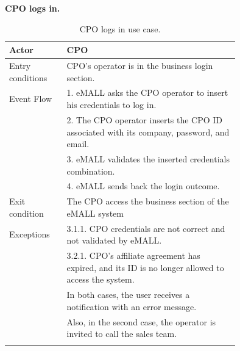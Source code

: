 \textbf{CPO logs in.}
\begin{center}
    \begin{longtable}{lp{0.75\linewidth}}
        \hline
        Actor            & CPO                                                                                                 \\
        \hline
        Entry conditions & CPO’s operator is in the business login section.                                                    \\
        \hline
        Event Flow       & 1. eMALL asks the CPO operator to insert his credentials to log in.                                 \\
        & 2. The CPO operator inserts the CPO ID associated with its company, password, and email.            \\
        & 3. eMALL validates the inserted credentials combination.                                            \\
        & 4. eMALL sends back the login outcome.                                                              \\
        \hline
        Exit condition   & The CPO access the business section of the eMALL system                                             \\
        \hline
        Exceptions       & 3.1.1. CPO credentials are not correct and not validated by eMALL.                                  \\
        & 3.2.1. CPO’s affiliate agreement has expired, and its ID is no longer allowed to access the system. \\
        & In both cases, the user receives a notification with an error message.                              \\
        & Also, in the second case, the operator is invited to call the sales team.                           \\
        \hline
        \caption{CPO logs in use case.}
        \label{tab: CPO_logs_in_use_case}
    \end{longtable}
\end{center}

